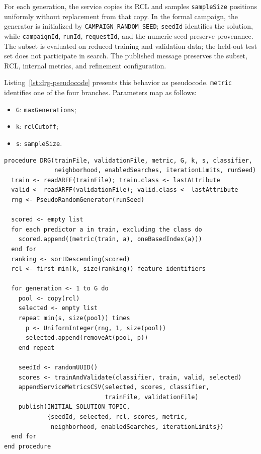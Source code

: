 For each generation, the service copies its RCL and samples \texttt{sampleSize} positions uniformly without replacement from that copy. In the formal campaign, the generator is initialized by \texttt{CAMPAIGN\_RANDOM\_SEED}; \texttt{seedId} identifies the solution, while \texttt{campaignId}, \texttt{runId}, \texttt{requestId}, and the numeric seed preserve provenance. The subset is evaluated on reduced training and validation data; the held-out test set does not participate in search. The published message preserves the subset, RCL, internal metrics, and refinement configuration.

Listing~\ref{lst:drg-pseudocode} presents this behavior as pseudocode. \texttt{metric} identifies one of the four branches. Parameters map as follows:
\begin{itemize}
  \item \texttt{G}: \texttt{maxGenerations};
  \item \texttt{k}: \texttt{rclCutoff};
  \item \texttt{s}: \texttt{sampleSize}.
\end{itemize}

\begin{lstlisting}[caption={Implemented RCL formation and randomized construction in the DRG.},label={lst:drg-pseudocode},basicstyle=\ttfamily\small,breaklines=true,columns=fullflexible]
procedure DRG(trainFile, validationFile, metric, G, k, s, classifier,
              neighborhood, enabledSearches, iterationLimits, runSeed)
  train <- readARFF(trainFile); train.class <- lastAttribute
  valid <- readARFF(validationFile); valid.class <- lastAttribute
  rng <- PseudoRandomGenerator(runSeed)

  scored <- empty list
  for each predictor a in train, excluding the class do
    scored.append((metric(train, a), oneBasedIndex(a)))
  end for
  ranking <- sortDescending(scored)
  rcl <- first min(k, size(ranking)) feature identifiers

  for generation <- 1 to G do
    pool <- copy(rcl)
    selected <- empty list
    repeat min(s, size(pool)) times
      p <- UniformInteger(rng, 1, size(pool))
      selected.append(removeAt(pool, p))
    end repeat

    seedId <- randomUUID()
    scores <- trainAndValidate(classifier, train, valid, selected)
    appendServiceMetricsCSV(selected, scores, classifier,
                            trainFile, validationFile)
    publish(INITIAL_SOLUTION_TOPIC,
            {seedId, selected, rcl, scores, metric,
             neighborhood, enabledSearches, iterationLimits})
  end for
end procedure
\end{lstlisting}

